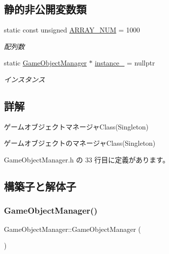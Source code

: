 \subsection*{静的非公開変数類}
\begin{DoxyCompactItemize}
\item 
static const unsigned \mbox{\hyperlink{class_game_object_manager_a591934d64d750c10c03c908371470681}{A\+R\+R\+A\+Y\+\_\+\+N\+UM}} = 1000
\begin{DoxyCompactList}\small\item\em 配列数 \end{DoxyCompactList}\item 
static \mbox{\hyperlink{class_game_object_manager}{Game\+Object\+Manager}} $\ast$ \mbox{\hyperlink{class_game_object_manager_ab21e2defb8f4f41bded4f8ab98be07aa}{instance\+\_\+}} = nullptr
\begin{DoxyCompactList}\small\item\em インスタンス \end{DoxyCompactList}\end{DoxyCompactItemize}


\subsection{詳解}
ゲームオブジェクトマネージャ\+Class(\+Singleton) 

ゲームオブジェクトのマネージャ\+Class(\+Singleton) 

 Game\+Object\+Manager.\+h の 33 行目に定義があります。



\subsection{構築子と解体子}
\mbox{\label{class_game_object_manager_a58cbaec4182cda7c6d48eef7b14885e8}} 
\subsubsection{\texorpdfstring{Game\+Object\+Manager()}{GameObjectManager()}\hspace{0.1cm}{\footnotesize\ttfamily [1/2]}}
{\footnotesize\ttfamily Game\+Object\+Manager\+::\+Game\+Object\+Manager (\begin{DoxyParamCaption}{ }\end{DoxyParamCaption})\hspace{0.3cm}{\ttfamily [private]}}



